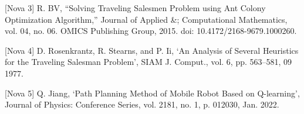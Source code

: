 \documentclass{article}
\begin{document}
	[Nova 3] R. BV, “Solving Traveling Salesmen Problem using Ant Colony Optimization Algorithm,” Journal of Applied \&; Computational Mathematics, vol. 04, no. 06. OMICS Publishing Group, 2015. doi: 10.4172/2168-9679.1000260.
	
	[Nova 4]
	D. Rosenkrantz, R. Stearns, and P. Ii, ‘An Analysis of Several Heuristics for the Traveling Salesman Problem’, SIAM J. Comput., vol. 6, pp. 563–581, 09 1977.
	
	[Nova 5]
	Q. Jiang, ‘Path Planning Method of Mobile Robot Based on Q-learning’, Journal of Physics: Conference Series, vol. 2181, no. 1, p. 012030, Jan. 2022.
	
	
\end{document}
